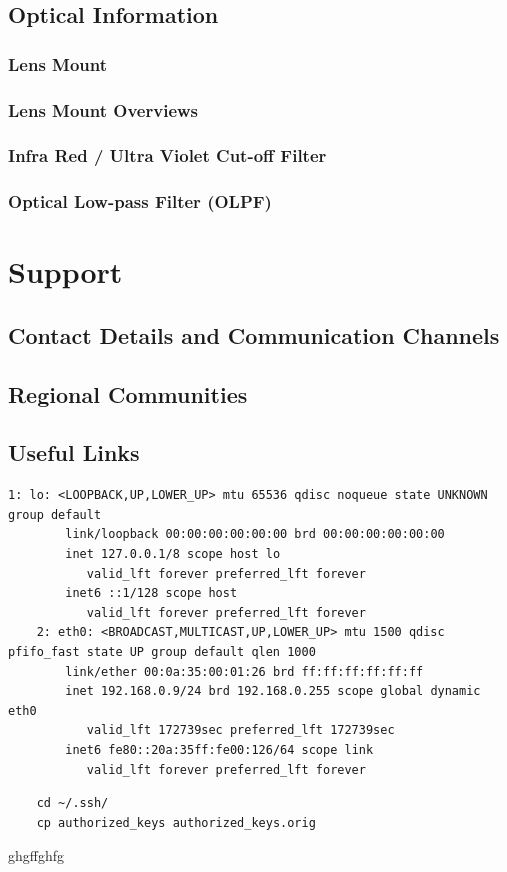 \documentclass{article}
\begin{document}
\subsection{Optical Information}
\subsubsection{Lens Mount}
\subsubsection{Lens Mount Overviews}
\subsubsection{Infra Red / Ultra Violet Cut-off Filter}
\subsubsection{Optical Low-pass Filter (OLPF)}

\section{Support}
\subsection{Contact Details and Communication Channels}
\subsection{Regional Communities}
\subsection{Useful Links}





\begin{lstlisting}[breaklines=true, breakatwhitespace=true]
    1: lo: <LOOPBACK,UP,LOWER_UP> mtu 65536 qdisc noqueue state UNKNOWN group default 
        link/loopback 00:00:00:00:00:00 brd 00:00:00:00:00:00
        inet 127.0.0.1/8 scope host lo
           valid_lft forever preferred_lft forever
        inet6 ::1/128 scope host 
           valid_lft forever preferred_lft forever
    2: eth0: <BROADCAST,MULTICAST,UP,LOWER_UP> mtu 1500 qdisc pfifo_fast state UP group default qlen 1000
        link/ether 00:0a:35:00:01:26 brd ff:ff:ff:ff:ff:ff
        inet 192.168.0.9/24 brd 192.168.0.255 scope global dynamic eth0
           valid_lft 172739sec preferred_lft 172739sec
        inet6 fe80::20a:35ff:fe00:126/64 scope link 
           valid_lft forever preferred_lft forever
\end{lstlisting}


\begin{lstlisting}
    cd ~/.ssh/
    cp authorized_keys authorized_keys.orig
\end{lstlisting}


ghgffghfg
\end{document}
